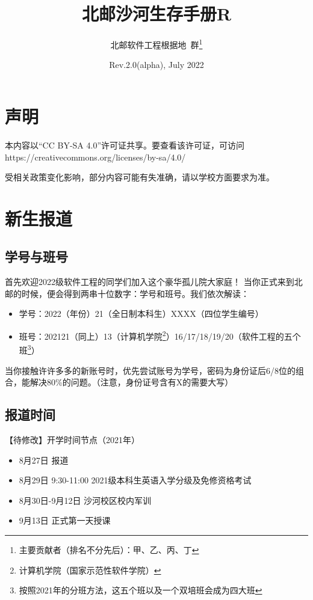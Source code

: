 \documentclass[UTF8]{ctexart}
\title{\textbf{北邮沙河生存手册R}}
\author{北邮软件工程根据地\ 群\thanks{主要贡献者（排名不分先后）：甲、乙、丙、丁}}
\date{Rev.2.0(alpha), July 2022}
\begin{document}
\maketitle
\section*{声明}
\begin{center}
本内容以“CC BY-SA 4.0”许可证共享。要查看该许可证，可访问\\
https://creativecommons.org/licenses/by-sa/4.0/

受相关政策变化影响，部分内容可能有失准确，请以学校方面要求为准。
\end{center}
\tableofcontents
\newpage

\section{新生报道}

\subsection*{学号与班号}

首先欢迎2022级软件工程的同学们加入这个豪华孤儿院大家庭！
当你正式来到北邮的时候，便会得到两串十位数字：学号和班号。我们依次解读：
\begin{itemize}
    \kaishu
    \item 学号：2022（年份）21（全日制本科生）XXXX（四位学生编号）
    \item 班号：202121（同上）13（计算机学院\footnote{计算机学院（国家示范性软件学院）}）16/17/18/19/20（软件工程的五个班\footnote{按照2021年的分班方法，这五个班以及一个双培班会成为四大班}）
\end{itemize}

当你接触许许多多的新账号时，优先尝试账号为学号，密码为身份证后6/8位的组合，能解决80\%的问题。（注意，身份证号含有X的需要大写）

\subsection*{报道时间}

{\heiti 【待修改】开学时间节点（2021年）}
\begin{itemize}
\kaishu
    \item 8月27日 报道
    \item 8月29日 9:30-11:00 2021级本科生英语入学分级及免修资格考试
    \item 8月30日-9月12日 沙河校区校内军训
    \item 9月13日 正式第一天授课
\end{itemize}
\end{document}
